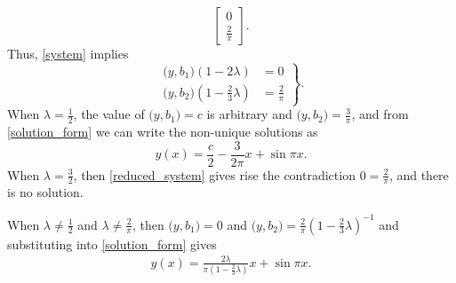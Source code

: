 \documentclass{homework}
\begin{document}
\begin{solution}
$$	\begin{bmatrix}
	 0\\
	\frac 2\pi 
	\end{bmatrix}.
  $$
  Thus, \eqref{system} implies
  \begin{equation}
  \left.
  \begin{array}{rl}
    \Big(y,b_1\Big)(1-2\lambda) &= 0\\
    \Big(y,b_2\Big)(1-\frac 23\lambda) &= \frac 2\pi 
    \end{array}
  \right\}. \label{reduced_system}
  \end{equation}
  When $\lambda = \frac 12$, the value of $\Big(y,b_1\Big) = c$ is arbitrary and $\Big(y,b_2\Big) = \frac 3{\pi}$, and from \eqref{solution_form} we can write the non-unique solutions as 
  $$
    y(x) = \frac c2 - \frac 3{2\pi} x + \sin\pi x.
  $$
  When $\lambda = \frac 32$, then \eqref{reduced_system} gives rise the contradiction $0=\frac 2\pi$, and there is no solution.

  When $\lambda\not= \frac 12$ and $\lambda\not= \frac 2\pi$, then $ \Big(y,b_1\Big) = 0$ and $\Big(y,b_2\Big)=\frac 2\pi(1-\frac 23\lambda)^{-1} $
  and substituting into \eqref{solution_form} gives
  \begin{align*}
    y(x) = \frac{2\lambda }{\pi\left(1-  \frac 23\lambda\right)} x + \sin \pi x.
  \end{align*}
\end{solution}

\newpage
{}
\end{document}
